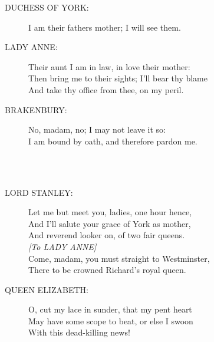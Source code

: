 \documentclass{article}
\begin{document}
\begin{description}
\item[DUCHESS OF YORK:] 
\hspace{1pt}I am their fathers mother; I will see them.\\
\end{description}
\begin{description}
\item[LADY ANNE:] 
\hspace{1pt}Their aunt I am in law, in love their mother:\\
\hspace{1pt}Then bring me to their sights; I'll bear thy blame\\
\hspace{1pt}And take thy office from thee, on my peril.\\
\end{description}
\begin{description}
\item[BRAKENBURY:] 
\hspace{1pt}No, madam, no; I may not leave it so:\\
\hspace{1pt}I am bound by oath, and therefore pardon me.\\
\end{description}
\centering{\it [Exit]}\\
\\
\begin{description}
\item[LORD STANLEY:] 
\hspace{1pt}Let me but meet you, ladies, one hour hence,\\
\hspace{1pt}And I'll salute your grace of York as mother,\\
\hspace{1pt}And reverend looker on, of two fair queens.\\
{\it [To LADY ANNE]}\\
\hspace{1pt}Come, madam, you must straight to Westminster,\\
\hspace{1pt}There to be crowned Richard's royal queen.\\
\end{description}
\begin{description}
\item[QUEEN ELIZABETH:] 
\hspace{1pt}O, cut my lace in sunder, that my pent heart\\
\hspace{1pt}May have some scope to beat, or else I swoon\\
\hspace{1pt}With this dead-killing news!\\
\end{description}
\end{document}
